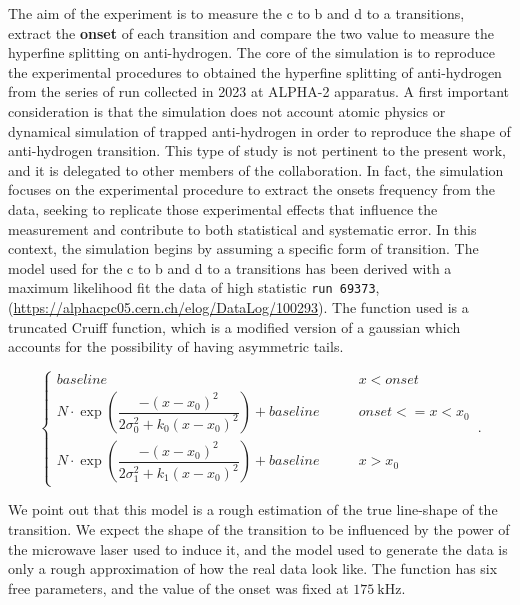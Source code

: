 \documentclass[11pt,a4paper,oneside]{article}
\begin{document}
The aim of the experiment is to measure the c to b and d to a transitions, extract the \textbf{onset} of each transition and compare the two value to measure the hyperfine splitting on anti-hydrogen. The core of the simulation is to reproduce the experimental procedures to obtained the hyperfine splitting of anti-hydrogen from the series of run collected in 2023 at ALPHA-2 apparatus. A first important consideration is that the simulation does not account atomic physics or dynamical simulation of trapped anti-hydrogen in order to reproduce the shape of anti-hydrogen transition. This type of study is not pertinent to the present work, and it is delegated to other members of the collaboration.
In fact, the simulation focuses on the experimental procedure to extract the onsets frequency from the data, seeking to replicate those experimental effects that influence the measurement and contribute to both statistical and systematic error.
In this context, the simulation begins by assuming a specific form of transition. The model used for the c to b and d to a transitions has been derived with a maximum likelihood fit the data of high statistic \texttt{run 69373}, (\url{https://alphacpc05.cern.ch/elog/DataLog/100293}). The function used is a truncated Cruiff function, which is a modified version of a gaussian which accounts for the possibility of having asymmetric tails.

\begin{equation} \label{eq:Cruiff}
    \begin{cases}
      baseline \qquad & x < onset\\
      N \cdot \exp \left( \dfrac{ -( x - x_{0})^2}{2 \sigma_{0}^{2} + k_{0}(x - x_{0})^2} \right) + baseline \qquad & onset <= x < x_{0} \\
      N \cdot \exp \left( \dfrac{ -( x - x_{0})^2}{ 2 \sigma_{1}^{2} + k_{1}(x - x_{0})^2} \right) + baseline \qquad & x > x_{0}
    \end{cases}\,.
\end{equation} 

We point out that this model is a rough estimation of the true line-shape of the transition. We expect the shape of the transition to be influenced by the power of the microwave laser used to induce it, and the model used to generate the data is only a rough approximation of how the real data look like. The function has six free parameters, and the value of the onset was fixed at $\SI{175}{ \kilo \hertz}$.
\end{document}
